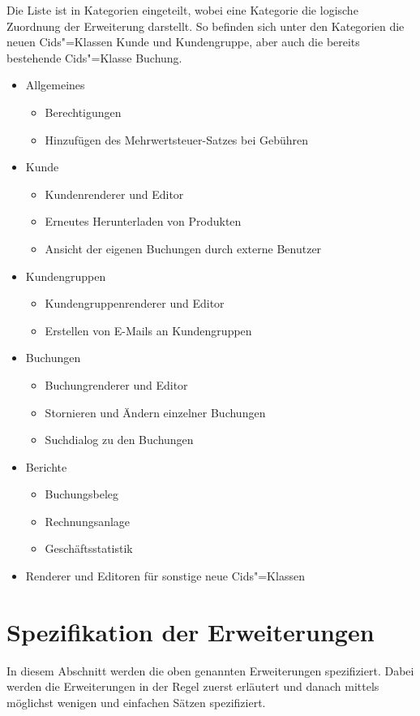 Die Liste ist in Kategorien eingeteilt, wobei eine Kategorie die logische Zuordnung der Erweiterung darstellt.
So befinden sich unter den Kategorien die neuen Cids"=Klassen Kunde und Kundengruppe, aber auch die bereits bestehende Cids"=Klasse Buchung. 
\begin{itemize}
	\item Allgemeines
	\begin{itemize}
		\item Berechtigungen
		\item Hinzufügen des Mehrwertsteuer-Satzes bei Gebühren
	\end{itemize}
	\item Kunde
	\begin{itemize}
		\item Kundenrenderer und Editor
		\item Erneutes Herunterladen von Produkten
		\item Ansicht der eigenen Buchungen durch externe Benutzer
	\end{itemize}
	\item Kundengruppen
	\begin{itemize}
		\item Kundengruppenrenderer und Editor
		\item Erstellen von E-Mails an Kundengruppen
	\end{itemize}
	\item Buchungen
	\begin{itemize}
		\item Buchungrenderer und Editor
		\item Stornieren und Ändern einzelner Buchungen
		\item Suchdialog zu den Buchungen
	\end{itemize}
	\item Berichte
	\begin{itemize}
		\item Buchungsbeleg
		\item Rechnungsanlage
		\item Geschäftsstatistik
	\end{itemize}	 
	\item Renderer und Editoren für sonstige neue Cids"=Klassen
\end{itemize}

\section{Spezifikation der Erweiterungen} \label{sec:spezifikation}
In diesem Abschnitt werden die oben genannten Erweiterungen spezifiziert. Dabei werden die Erweiterungen in der Regel zuerst erläutert und danach mittels möglichst wenigen und einfachen Sätzen spezifiziert.


